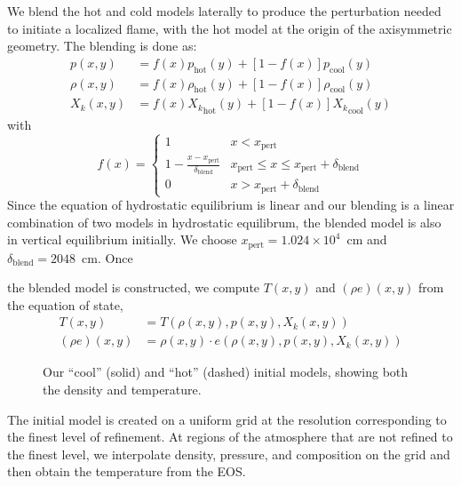 \documentclass[preprint,times,tighten]{aastex63}
\newcommand{\MarginPar}[1]{
    \marginpar{\vskip-\baselineskip%
               \raggedright%
               \tiny\sffamily%
               {\color{red}\hrule%
               \smallskip%
               #1\par%
               \smallskip%
               \hrule}}%
}
\begin{document}
We blend the hot and cold models laterally to produce the perturbation
needed to initiate a localized flame, with the hot model at the
origin of the axisymmetric geometry.  The blending is done as:
\begin{align}
p(x,y) &= f(x) p_\mathrm{hot}(y) + [1-f(x)] p_\mathrm{cool}(y) \\
\rho(x,y) &= f(x) \rho_\mathrm{hot}(y) + [1-f(x)] \rho_\mathrm{cool}(y) \\
X_k(x,y) &= f(x) {X_k}_\mathrm{hot}(y) + [1-f(x)] {X_k}_\mathrm{cool}(y)
\end{align}
with
\begin{equation}
f(x) = \begin{cases}
     1 & x < x_\mathrm{pert} \\
   1 - \frac{x - x_\mathrm{pert}}{\delta_\mathrm{blend}} & x_\mathrm{pert} \le x \le x_\mathrm{pert} + \delta_\mathrm{blend} \\
     0 & x > x_\mathrm{pert} + \delta_\mathrm{blend}
\end{cases}
\end{equation}
Since the equation of hydrostatic equilibrium is linear and our
blending is a linear combination of two models in hydrostatic
equilibrum, the blended model is also in vertical equilibrium initially.  We choose
$x_\mathrm{pert} = 1.024\times 10^4$~cm and $\delta_\mathrm{blend} = 2048$~cm.  Once \MarginPar{double check these numbers}
the blended model is constructed, we compute $T(x,y)$ and $(\rho e)(x,y)$
from the equation of state,
\begin{align}
  T(x,y) &= T(\rho(x,y), p(x,y), X_k(x,y)) \\
  (\rho e)(x,y) &= \rho(x, y) \cdot e(\rho(x,y), p(x,y), X_k(x,y)) 
\end{align}

\begin{figure}[t]
\centering
{}
\caption{\label{fig:initial_models} Our ``cool'' (solid) and ``hot''
  (dashed) initial models, showing both the density and temperature.}
\end{figure}

The initial model is created on a uniform grid at the resolution
corresponding to the finest level of refinement.  At regions of the
atmosphere that are not refined to the finest level, we interpolate
density, pressure, and composition on the grid and then obtain the
temperature from the EOS.  


\end{document}
